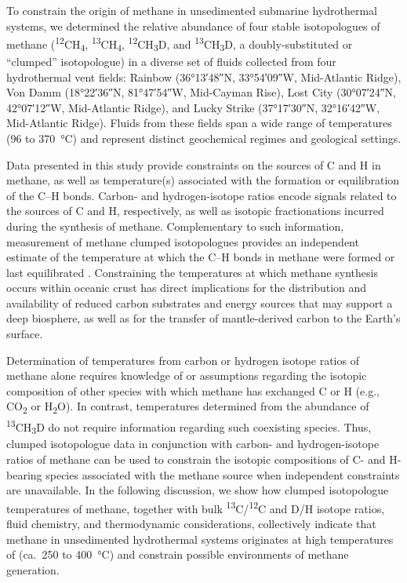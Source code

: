 To constrain the origin of methane in unsedimented submarine
hydrothermal systems, we determined the relative abundance of four
stable isotopologues of methane
(\textsuperscript{12}CH\textsubscript{4},
\textsuperscript{13}CH\textsubscript{4},
\textsuperscript{12}CH\textsubscript{3}D, and
\textsuperscript{13}CH\textsubscript{3}D, a doubly-substituted or
``clumped'' isotopologue) in a diverse set of fluids collected from four
hydrothermal vent fields: Rainbow (\ang[minimum-integer-digits=2]{36;13;48}N, \ang[minimum-integer-digits=2]{33;54;09}W,
Mid-Atlantic Ridge), Von Damm (\ang[minimum-integer-digits=2]{18;22;36}N, \ang{81;47;54}W, Mid-Cayman
Rise), Lost City (\ang[minimum-integer-digits=2]{30;07;24}N, \ang[minimum-integer-digits=2]{42;07;12}W, Mid-Atlantic Ridge), and
Lucky Strike (\ang[minimum-integer-digits=2]{37;17;30}N, \ang[minimum-integer-digits=2]{32;16;42}W, Mid-Atlantic Ridge). Fluids
from these fields span a wide range of temperatures (96 to 370~°C) and
represent distinct geochemical regimes and geological settings.

Data presented in this study provide constraints on the sources of C and
H in methane, as well as temperature(s) associated with the formation or
equilibration of the C--H bonds. Carbon- and hydrogen-isotope ratios
encode signals related to the sources of C and H, respectively, as well
as isotopic fractionations incurred during the synthesis of methane.
Complementary to such information, measurement of methane clumped
isotopologues provides an independent estimate of the temperature at
which the C--H bonds in methane were formed or last equilibrated \parencite{Stolper++_2014_S,Wang++_2015_S}. Constraining the temperatures
at which methane synthesis occurs within oceanic crust has direct
implications for the distribution and availability of reduced carbon
substrates and energy sources that may support a deep biosphere, as well
as for the transfer of mantle-derived carbon to the Earth's surface.

Determination of temperatures from carbon or hydrogen isotope ratios of
methane alone requires knowledge of or assumptions regarding the
isotopic composition of other species with which methane has exchanged C
or H (e.g., CO\textsubscript{2} or H\textsubscript{2}O). In contrast,
temperatures determined from the abundance of
\textsuperscript{13}CH\textsubscript{3}D do not require information
regarding such coexisting species. Thus, clumped isotopologue data in
conjunction with carbon- and hydrogen-isotope ratios of methane can be
used to constrain the isotopic compositions of C- and H-bearing species
associated with the methane source when independent constraints are
unavailable. In the following discussion, we show how clumped
isotopologue temperatures of methane, together with bulk
\textsuperscript{13}C/\textsuperscript{12}C and D/H isotope ratios,
fluid chemistry, and thermodynamic considerations, collectively indicate
that methane in unsedimented hydrothermal systems originates at high
temperatures of (ca.\ 250 to 400~°C) and constrain possible environments
of methane generation.


